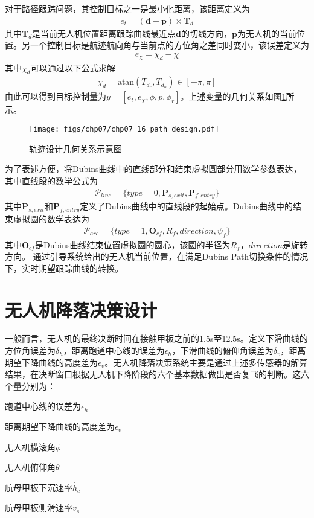 对于路径跟踪问题，其控制目标之一是最小化距离，该距离定义为
\begin{align}
e_t = (\mathbf{d}-\mathbf{p}) \times \mathbf{T}_d
\end{align}
其中$\mathbf{T}_d$是当前无人机位置距离跟踪曲线最近点$\mathbf{d}$的切线方向，$\mathbf{p}$为无人机的当前位置。另一个控制目标是航迹航向角与当前点的方位角之差同时变小，该误差定义为
\begin{align}
e_{\chi} = \chi_d-\chi
\end{align}
其中$\chi_d$可以通过以下公式求解
\begin{align}
\chi_d = \text{atan} (T_{d_e}, T_{d_n}) \in [-\pi, \pi]
\end{align}
由此可以得到目标控制量为$y=[e_t,e_\chi,\phi,p,\phi_r]$。上述变量的几何关系如图\ref{fig:chp07_16_path_design}所示。

\begin{figure}[ht]   
	\centering
	\texttt{[image: figs/chp07/chp07\_16\_path\_design.pdf]}
	\caption{轨迹设计几何关系示意图}
	\label{fig:chp07_16_path_design}
\end{figure}


为了表述方便，将Dubins曲线中的直线部分和结束虚拟圆部分用数学参数表达，其中直线段的数学公式为
\begin{align}
\mathcal{P}_{line} = \{type=0,\mathbf{P}_{s,exit},\mathbf{P}_{f,entry}\}
\end{align}
其中$\mathbf{P}_{s,exit}$和$\mathbf{P}_{f,entry}$定义了Dubins曲线中的直线段的起始点。Dubins曲线中的结束虚拟圆的数学表达为
\begin{align}
\mathcal{P}_{arc} = \{type=1,\mathbf{O}_{cf},R_f,direction,\psi_f\}
\end{align}
其中$\mathbf{O}_{cf}$是Dubins曲线结束位置虚拟圆的圆心，该圆的半径为$R_f$，$direction$是旋转方向。
通过引导系统给出的无人机当前位置，在满足Dubins Path切换条件的情况下，实时期望跟踪曲线的转换。

\section{无人机降落决策设计}
一般而言，无人机的最终决断时间在接触甲板之前的1.5s至12.5s。定义下滑曲线的方位角误差为$\delta_h$，距离跑道中心线的误差为$\epsilon_h$，下滑曲线的俯仰角误差为$\delta_v$，距离期望下降曲线的高度差为$\epsilon_v$。无人机降落决策系统主要是通过上述多传感器的解算结果，在决断窗口根据无人机下降阶段的六个基本数据做出是否复飞的判断。这六个量分别为：
\begin{compactenum}
	\item 跑道中心线的误差为$\epsilon_h$
	\item 距离期望下降曲线的高度差为$\epsilon_v$
	\item 无人机横滚角$\phi$
	\item 无人机俯仰角$\theta$
	\item 航母甲板下沉速率$\dot{h_c}$
	\item 航母甲板侧滑速率$v_s$
\end{compactenum}

